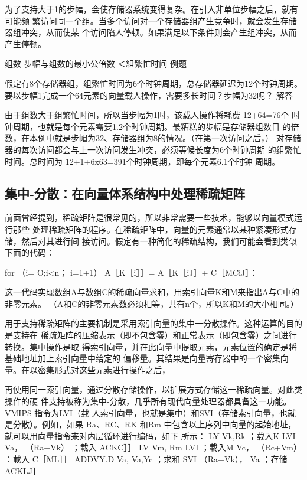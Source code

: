 为了支持大于1的步幅，会使存储器系统变得复杂。在引入非单位步幅之后，就有可能频
繁访问同一个组。当多个访问对一个存储器组产生竞争时，就会发生存储器组冲突，从而使某
个访问陷人停顿。如果满足以下条件则会产生组冲突，从而产生停顿。

组数
步幅与组数的最小公倍数
＜組繁忙时间
例题

假定有8个存储器组，组繁忙时间为6个时钟周期，总存储器延迟为12个时钟周期。
要以步幅1完成一个64元素的向量载人操作，需要多长时间？步幅为32呢？
解答

由于组数大于组繁忙时间，所以当步幅为1时，该载人操作将耗费 12+64=76个
时钟周期，也就是每个元素需要1.2个时钟周期。最糟糕的步幅是存储器组数目
的倍数，在本例中就是步帽为32、存储器组为8的情况。（在第一次访问之后，）
对存储器的每次访问都会与上一次访问发生冲突，必须等候长度为6个时钟周期
的组繁忙时间。总时间为 12+1+6x63=391个时钟周期，即每个元素6.1个时钟
周期。

\subsection{集中-分散：在向量体系结构中处理稀疏矩阵}

前面曾经提到，稀疏矩阵是很常见的，所以非常需要一些技术，能够以向量模式运行那些
处理稀疏矩阵的程序。在稀疏矩阵中，向量的元素通常以某种紧凑形式存储，然后对其进行间
接访问。假定有一种简化的稀疏结构，我们可能会看到类似下面的代码：

for （i= O;i<n；
i=1+1）
A［K［i］］= A［K［iJ］+ C［MCiJ］：

这一代码实现数组A与数组C的稀疏向量求和，用索引向量K和M来指出A与C中的非零元素。
（A和C的非零元素数必须相等，共有n个，所以K和M的大小相同。）

用于支持稀疏矩阵的主要机制是采用索引向量的集中一分散操作。这种运算的目的是支持在
稀疏矩阵的压缩表示（即不包含零）和正常表示（即包含零）之间进行转换。集中操作是取
得索引向量，并在此向量中提取元素，元素位置的确定是将基础地址加上索引向量中给定的
偏移量。其结果是向量寄存器中的一个密集向量。在以密集形式对这些元素进行操作之后，

再使用同一索引向量，通过分散存储操作，以扩展方式存储这一稀疏向量。对此类操作的硬
件支持被称为集中-分散，几乎所有现代向量处理器都具备这一功能。VMIPS 指令为LVI（载
人索引向量，也就是集中）和SVI（存储索引向量，也就是分散）。例如，如果 Ra、RC、RK
和Rm 中包含以上序列中向量的起始地址，就可以用向量指令来对内层循环进行编码，如下
所示：
LY
Vk,Rk
；载入K
LVI
Va， （Ra+Vk）
；載入 ACKC］］
LV
Vm, Rm
LVI
；載入M
Vc， （Rc+Vm）
：載入 C［ML］］
ADDVY.D
Va, Va,Yc
；求和
SVI
（Ra+Vk）， Va
；存储 ACKLJ］

